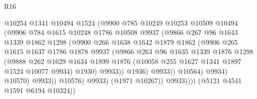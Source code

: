 \begin{lexlean}{R16}
\begin{coremodule}
                            @10254
                            @1341
                            @10494
                            @1524
                            (@9900
                              @785
                              @10249
                              @10253
                              @10509
                              @10494
                              (@9906
                                @784
                                @1615
                                @10248
                                @1786
                                @10508
                                @9937
                                (@9866
                                  @267
                                  @96
                                  @1643
                                  @1339
                                  @1862
                                  @1298
                                  (@9900
                                    @266
                                    @1638
                                    @1642
                                    @1879
                                    @1862
                                    (@9906
                                      @265
                                      @1615
                                      @1637
                                      @1786
                                      @1878
                                      @9937
                                      (@9866
                                        @263
                                        @96
                                        @1635
                                        @1339
                                        @1876
                                        @1298
                                        (@9888
                                          @262
                                          @1629
                                          @1634
                                          @1899
                                          @1876
                                          (@10058 @255 @1627 @1341 @1897 @1524 @10077 @9934)
                                          @1930)
                                        @9933))
                                    @1936)
                                  @9933))
                              @10564)
                            @9934)
                          @10570)
                        @9933))
                    @10576)
                  @9933)
                (@1971 @10267))
              @9933))))
      (@5121 @4541 @1591 @6194 @10324))

\end{coremodule}
\end{lexlean}

